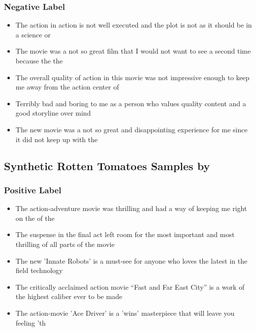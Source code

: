 \subsubsection{Negative Label}
\begin{itemize}
    \item The action in action is not well executed and the plot is not as it should be in a science or 
    \item The movie was a not so great film that I would not want to see a second time because the the 
    \item  The overall quality of action in this movie was not impressive enough to keep me away from the action center of 
    \item Terribly bad and boring to me as a person who values quality content and a good storyline over mind 
    \item The new movie was a not so great and disappointing experience for me since it did not keep up with the 
\end{itemize}
\subsection{Synthetic Rotten Tomatoes Samples by \alg}
\subsubsection{Positive Label}
\begin{itemize}
    \item  The action-adventure movie was thrilling and had a way of keeping me right on the of the 
    \item The suspense in the final act left room for the most important and most thrilling of all parts of the movie
    \item The new 'Innate Robots' is a must-see for anyone who loves the latest in the field technology 
    \item  The critically acclaimed action movie ``Fast and Far East City'' is a work of the highest caliber ever to be made 
    \item The action-movie 'Ace Driver' is a 'wins' masterpiece that will leave you feeling 'th
\end{itemize}
